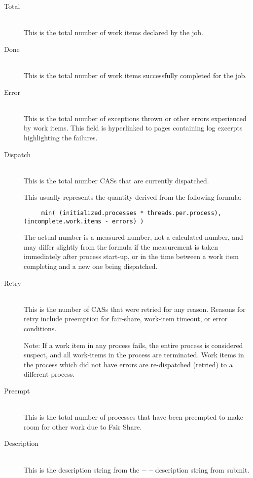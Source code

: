 \begin{description}
            \item[Total] \hfill \\
              This is the total number of work items declared by the job.
              
            \item[Done] \hfill \\
              This is the total number of work items successfully completed for the job.
              
            \item[Error] \hfill \\
              This is the total number of exceptions thrown or other errors experienced by work
              items. This field is hyperlinked to pages containing log excerpts highlighting
              the failures.
              
            \item[Dispatch] \hfill \\
              This is the total number CASs that are currently dispatched. 

              This usually represents the quantity derived from the following formula:
\begin{verbatim}              
     min( (initialized.processes * threads.per.process), (incomplete.work.items - errors) )
\end{verbatim}

              The actual number is a measured number, not a calculated number, and may differ
              slightly from the formula if the measurement is taken immediately after process
              start-up, or in the time between a work item completing and a new one being
              dispatched.
              
            \item[Retry] \hfill \\
              This is the number of CASs that were retried for any reason.  Reasons for retry
              include preemption for fair-share, work-item timeout, or error conditions.

              Note: If a work item in any process fails, the entire process is considered
              suspect, and all work-items in the process are terminated.  Work items in the
              process which did not have errors are re-dispatched (retried) to a different
              process.
              
            \item[Preempt] \hfill \\
              This is the total number of processes that have been preempted to make room for
              other work due to Fair Share.
              
            \item[Description] \hfill \\
              This is the description string from the $--$description string from submit.
            \end{description}
